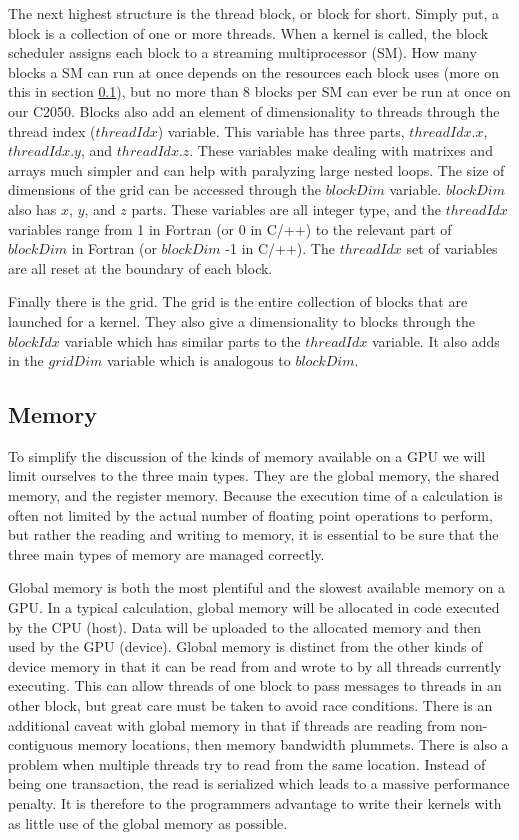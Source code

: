 \documentclass[12pt]{report}
\begin{document}
The next highest structure is the thread block, or block for short. Simply put, a block is a collection of one or more threads. When a kernel is called, the block scheduler assigns each block to a streaming multiprocessor (SM). How many blocks a SM can run at once depends on the resources each block uses (more on this in section \ref{sec:gpumem}), but no more than 8 blocks per SM can ever be run at once on our C2050. Blocks also add an element of dimensionality to threads through the thread index ($threadIdx$) variable. This variable has three parts, $threadIdx.x$, $threadIdx.y$, and $threadIdx.z$. These variables make dealing with matrixes and arrays much simpler and can help with paralyzing large nested loops. The size of dimensions of the grid can be accessed through the $blockDim$ variable. $blockDim$ also has $x$, $y$, and $z$ parts. These variables are all integer type, and the $threadIdx$ variables range from 1 in Fortran (or 0 in C/++) to the relevant part of $blockDim$ in Fortran (or $blockDim$ -1 in C/++). The $threadIdx$ set of variables are all reset at the boundary of each block. 

Finally there is the grid. The grid is the entire collection of blocks that are launched for a kernel. They also give a dimensionality to blocks through the $blockIdx$ variable which has similar parts to the $threadIdx$ variable. It also adds in the $gridDim$ variable which is analogous to $blockDim$.

\subsection{Memory}
\label{sec:gpumem}
To simplify the discussion of the kinds of memory available on a GPU we will limit ourselves to the three main types. They are the global memory, the shared memory, and the register memory. Because the execution time of a calculation is often not limited by the actual number of floating point operations to perform, but rather the reading and writing to memory, it is essential to be sure that the three main types of memory are managed correctly.

Global memory is both the most plentiful and the slowest available memory on a GPU. In a typical calculation, global memory will be allocated in code executed by the CPU (host). Data will be uploaded to the allocated memory and then used by the GPU (device). Global memory is distinct from the other kinds of device memory in that it can be read from and wrote to by all threads currently executing. This can allow threads of one block to pass messages to threads in an other block, but great care must be taken to avoid race conditions. There is an additional caveat with global memory in that if threads are reading from non-contiguous memory locations, then memory bandwidth plummets. There is also a problem when multiple threads try to read from the same location. Instead of being one transaction, the read is serialized which leads to a massive performance penalty. It is therefore to the programmers advantage to write their kernels with as little use of the global memory as possible.
\end{document}
